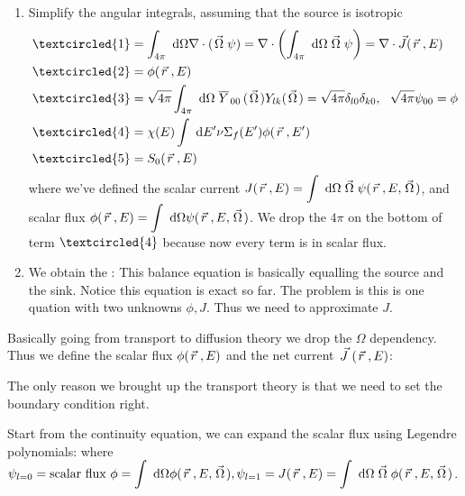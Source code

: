 \documentclass{school-22.211-notes}
\begin{document}
\begin{enumerate}
\item Simplify the angular integrals, assuming that the source is isotropic
\begin{align}
\textcircled{1} &= \int_{4\pi} \dOmega \divergence (\vecOmega \psi) = \divergence \left(\int_{4\pi} \dOmega \vecOmega \psi \right) = \divergence \vec{J} (\vecr, E) \\
\textcircled{2} &= \phi(\vecr, E) \\
\textcircled{3} &= \sqrt{4\pi} \int_{4\pi} \dOmega \bar{Y}_{00}(\vecOmega) Y_{lk} (\vecOmega) = \sqrt{4\pi} \delta_{l0}\delta_{k0}, \fsp \fsp \sqrt{4 \pi } \psi_{00} = \phi \\
\textcircled{4} &= \chi(E) \int \dE' \nu \Sigma_f (E') \phi(\vecr, E') \\
\textcircled{5} &= S_0 (\vecr, E) 
\end{align}
where we've defined the scalar current $\displaystyle J(\left.\vec{r}\right., E) = \int \mbox{ }\mathrm{d} \Omega \left.\vec{\Omega}\right. \psi (\left.\vec{r}\right., E, \left.\vec{\Omega}\right.)$, and scalar flux $\displaystyle \phi(\left.\vec{r}\right., E) = \int \mbox{ }\mathrm{d} \Omega \psi(\left.\vec{r}\right., E,  \left.\vec{\Omega}\right.)$. We drop the $4 \pi$ on the bottom of term $\textcircled{4}$ because now every term is in scalar flux. 

\item We obtain the : \scriptsize
{} \normalsize
This balance equation is basically equalling the source and the sink. Notice this equation is exact so far. The problem is this is one quation with two unknowns $\phi, J$. Thus we need to approximate $J$. 
\end{enumerate}

Basically going from transport to diffusion theory we drop the $\Omega$ dependency. Thus we define the scalar flux $\phi(\left.\vec{r}\right., E)$ and the net current $\left.\vec{J}\right. (\left.\vec{r}\right., E)$: 

The only reason we brought up the transport theory is that we need to set the boundary condition right.  




\clearpage
{}
Start from the continuity equation, we can expand the scalar flux using Legendre polynomials: 
where $\displaystyle \psi_{l=0} = \mbox{scalar flux } \phi = \int \mbox{ }\mathrm{d} \Omega \phi(\left.\vec{r}\right., E, \left.\vec{\Omega}\right.), \psi_{l=1} = J(\left.\vec{r}\right., E) = \int \mbox{ }\mathrm{d} \Omega \left.\vec{\Omega}\right. \phi(\left.\vec{r}\right., E, \left.\vec{\Omega}\right.)$. 
\end{document}
